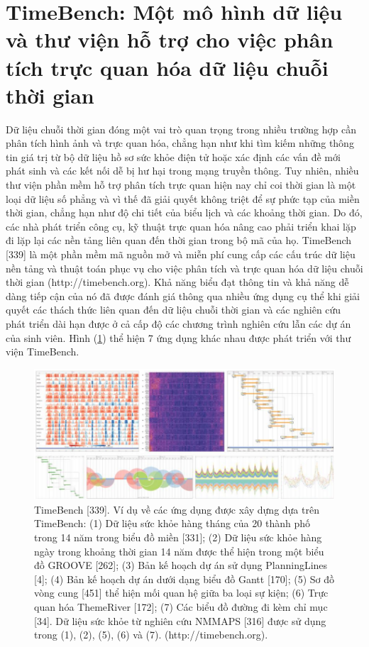\section{TimeBench: Một mô hình dữ liệu và thư viện hỗ trợ cho việc phân tích trực quan hóa dữ liệu chuỗi thời gian}
Dữ liệu chuỗi thời gian đóng một vai trò quan trọng trong nhiều trường hợp cần phân tích hình ảnh và trực quan hóa, chẳng hạn như khi tìm kiếm những thông tin giá trị từ bộ dữ liệu hồ sơ sức khỏe điện tử hoặc xác định các vấn đề mới phát sinh và các kết nối dễ bị hư hại trong mạng truyền thông. Tuy nhiên, nhiều thư viện phần mềm hỗ trợ phân tích trực quan hiện nay chỉ coi thời gian là một loại dữ liệu số phẳng và vì thế đã giải quyết không triệt để sự phức tạp của miền thời gian, chẳng hạn như độ chi tiết của biểu lịch và các khoảng thời gian. Do đó, các nhà phát triển công cụ, kỹ thuật trực quan hóa nâng cao phải triển khai lặp đi lặp lại các nền tảng liên quan đến thời gian trong bộ mã của họ.
TimeBench [339] là một phần mềm mã nguồn mở và miễn phí cung cấp các cấu trúc dữ liệu nền tảng và thuật toán phục vụ cho việc phân tích và trực quan hóa dữ liệu chuỗi thời gian (http://timebench.org). Khả năng biểu đạt thông tin và khả năng dễ dàng tiếp cận của nó đã được đánh giá thông qua nhiều ứng dụng cụ thể khi giải quyết các thách thức liên quan đến dữ liệu chuỗi thời gian và các nghiên cứu phát triển dài hạn được ở cả cấp độ các chương trình nghiên cứu lẫn các dự án của sinh viên. Hình (\ref{fig:f7.16}) thể hiện 7 ứng dụng khác nhau được phát triển với thư viện TimeBench.
\begin{figure}[H] %
    \centering %
    \includegraphics[width=1\textwidth]{assets/fig_7_16.png} 
    \caption{TimeBench [339]. Ví dụ về các ứng dụng được xây dựng dựa trên TimeBench: (1) Dữ liệu sức khỏe hàng tháng của 20 thành phố trong 14 năm trong biểu đồ miền [331]; (2) Dữ liệu sức khỏe hàng ngày trong khoảng thời gian 14 năm được thể hiện trong một biểu đồ GROOVE [262]; (3) Bản kế hoạch dự án sử dụng PlanningLines [4]; (4) Bản kế hoạch dự án dưới dạng biểu đồ Gantt [170]; (5) Sơ đồ vòng cung [451] thể hiện mối quan hệ giữa ba loại sự kiện; (6) Trực quan hóa ThemeRiver [172]; (7) Các biểu đồ đường đi kèm chỉ mục [34]. Dữ liệu sức khỏe từ nghiên cứu NMMAPS [316] được sử dụng trong (1), (2), (5), (6) và (7). (http://timebench.org).} %
    \label{fig:f7.16}
\end{figure}